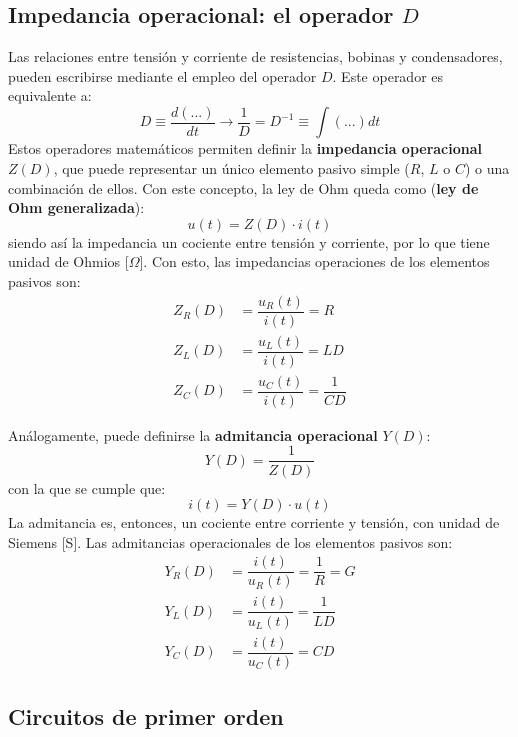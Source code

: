 \subsection{Impedancia operacional: el operador $D$
}\label{sec:operador_D}
Las relaciones entre tensión y corriente de resistencias, bobinas y
condensadores, pueden escribirse mediante el empleo del operador
$D$. Este operador es equivalente a:
\begin{equation*}
  D\equiv \dfrac{d(...)}{dt} \rightarrow \dfrac{1}{D}=D^{-1}\equiv \int (...) dt
\end{equation*}
Estos operadores matemáticos permiten definir la \textbf{impedancia
  operacional} $Z(D)$, que puede representar un único elemento pasivo
simple ($R$, $L$ o $C$) o una combinación de ellos. Con este concepto,
la ley de Ohm queda como (\textbf{ley de Ohm generalizada}):
\begin{equation*}
  u(t)=Z(D)\cdot i(t)
\end{equation*}
siendo así la impedancia un cociente entre tensión y corriente, por lo
que tiene unidad de Ohmios [$\Omega$].  Con esto, las impedancias
operaciones de los elementos pasivos son:
\begin{align*}
  Z_R(D)&=\dfrac{u_R(t)}{i(t)}=R\\
  Z_L(D)&=\dfrac{u_L(t)}{i(t)}=LD\\
  Z_C(D)&=\dfrac{u_C(t)}{i(t)}=\dfrac{1}{CD}
\end{align*}
	
Análogamente, puede definirse la \textbf{admitancia operacional}
$Y(D)$:
\begin{equation*}
  Y(D)=\dfrac{1}{Z(D)}
\end{equation*}
con la que se cumple que:
\begin{equation*}
  i(t)=Y(D)\cdot u(t)
\end{equation*}
La admitancia es, entonces, un cociente entre corriente y tensión, con
unidad de Siemens [S]. Las admitancias operacionales de los elementos
pasivos son:
\begin{align*}
  Y_R(D)&=\dfrac{i(t)}{u_R(t)}=\dfrac{1}{R}=G\\
  Y_L(D)&=\dfrac{i(t)}{u_L(t)}=\dfrac{1}{LD}\\
  Y_C(D)&=\dfrac{i(t)}{u_C(t)}=CD
\end{align*} 

\subsection{Circuitos de primer orden}\label{sec:primer_orden}
	
